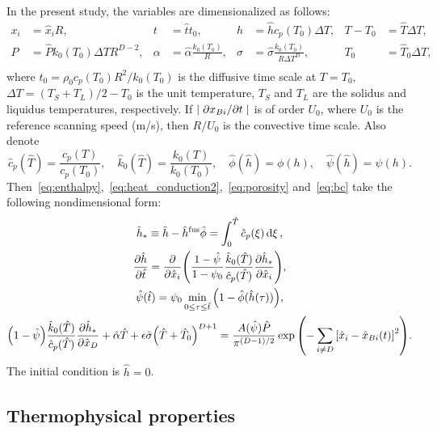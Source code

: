 \documentclass{article}
\newcommand{\fusion}[1]{{#1}^\mathrm{fus}}
\newcommand{\Hx}{\hat{x}}
\newcommand{\Ht}{\hat{t}}
\newcommand{\Hh}{\hat{h}}
\newcommand{\HT}{\hat{T}}
\newcommand{\HP}{\hat{P}}
\newcommand{\Halpha}{\hat{\alpha}}
\newcommand{\Hsigma}{\hat{\sigma}}
\newcommand{\Hc}{\hat{c}}
\newcommand{\Hk}{\hat{k}}
\newcommand{\Hphi}{\hat{\phi}}
\newcommand{\Hpsi}{\hat{\psi}}
\begin{document}
In the present study, the variables are dimensionalized as follows:
\begin{equation}\label{eq:dimensionless}
    \begin{aligned}
        x_i &= \Hx_iR, & t &= \Ht t_0, & h &= \Hh c_p(T_0)\Delta{T}, & T - T_0 &= \HT\Delta{T}, \\
        P &= \HP k_0(T_0)\Delta{T}R^{D-2}, & \alpha &= \Halpha\frac{k_0(T_0)}R, &
            \sigma &= \Hsigma\frac{k_0(T_0)}{R\Delta{T}^D}, & T_0 &= \HT_0\Delta{T}, \\
    \end{aligned}
\end{equation}
where \(t_0 = \rho_0 c_p(T_0) R^2/k_0(T_0)\) is the diffusive time scale at \(T=T_0\),
\(\Delta{T} = (T_S+T_L)/2 - T_0\) is the unit temperature,
\(T_S\) and \(T_L\) are the solidus and liquidus temperatures, respectively.
If \(|\pdv*{x_{Bi}}{t}|\) is of order \(U_0\), where \(U_0\) is the reference scanning speed (\si{m/s}),
then \(R/U_0\) is the convective time scale. Also denote
\begin{equation}\label{eq:dimensionless2}
    \Hc_p(\HT) = \frac{c_p(T)}{c_p(T_0)}, \quad
    \Hk_0(\HT) = \frac{k_0(T)}{k_0(T_0)}, \quad
    \Hphi(\Hh) = \phi(h), \quad
    \Hpsi(\Hh) = \psi(h).
\end{equation}
Then~\eqref{eq:enthalpy},~\eqref{eq:heat_conduction2},~\eqref{eq:porosity} and~\eqref{eq:bc} take the following nondimensional form:
\begin{gather}
	\Hh_* \equiv \Hh - \fusion{\Hh}\Hphi = \int_0^{\HT} \Hc_p(\xi)\dd{\xi}, \label{eq:enthalpy_hats} \\
	\pdv{\Hh}{\Ht} = \pdv{\Hx_i}\qty(
	    \frac{1-\Hpsi}{1-\psi_0}
	    \frac{\Hk_0(\HT)}{\Hc_p(\HT)}\pdv{\Hh_*}{\Hx_i}
	), \label{eq:heat_conduction_hats} \\
	\Hpsi(\Ht) = \psi_0\min_{0\leq\tau\leq \Ht}\qty( 1-\Hphi(\Hh(\tau)) ), \label{eq:porosity_hats} \\
	\qty(1 - \Hpsi) \frac{\Hk_0(\HT)}{\Hc_p(\HT)}\pdv{\Hh_*}{\Hx_D} +
	    \Halpha\HT + \epsilon\Hsigma \qty(\HT + \HT_0)^{D+1} =
	    \frac{A(\Hpsi)\HP}{\pi^{(D-1)/2}}\exp\qty( -\sum_{i\neq D}\qty[\Hx_i-\Hx_{Bi}(t)]^2 ). \label{eq:bc_hats}
\end{gather}
The initial condition is \(\Hh = 0\).

\subsection{Thermophysical properties}
\end{document}
